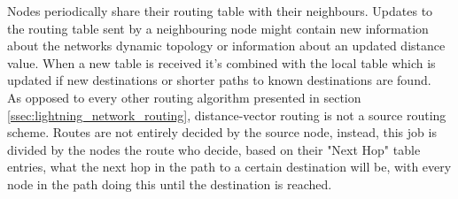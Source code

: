 Nodes periodically share their routing table with their neighbours. Updates to the routing table sent by a neighbouring node might contain new information about the networks dynamic topology or information about an updated distance value. When a new table is received it's combined with the local table which is updated if new destinations or shorter paths to known destinations are found. \\
As opposed to every other routing algorithm presented in section \ref{ssec:lightning_network_routing}, distance-vector routing is not a source routing scheme. Routes are not entirely decided by the source node, instead, this job is divided by the nodes the route who decide, based on their "Next Hop" table entries, what the next hop in the path to a certain destination will be, with every node in the path doing this until the destination is reached. \\